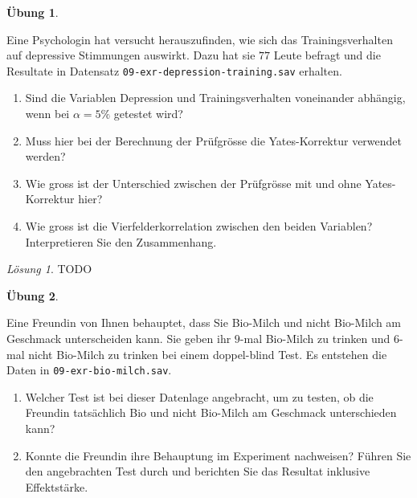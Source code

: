 \documentclass[
]{book}
\providecommand{\tightlist}{%
  \setlength{\itemsep}{0pt}\setlength{\parskip}{0pt}}
\theoremstyle{definition}
\theoremstyle{definition}
\theoremstyle{definition}
\newtheorem{exercise}{Übung}[chapter]
\theoremstyle{definition}
\theoremstyle{remark}
\newtheorem*{solution}{Lösung}
\begin{document}
\begin{exercise}
\protect\hypertarget{exr:depression-training}{}\label{exr:depression-training}\leavevmode

Eine Psychologin hat versucht herauszufinden, wie sich das Trainingsverhalten auf depressive Stimmungen auswirkt. Dazu hat sie \(77\) Leute befragt und die Resultate in Datensatz \texttt{09-exr-depression-training.sav} erhalten.

\begin{enumerate}
\def\labelenumi{\alph{enumi})}
\tightlist
\item
  Sind die Variablen Depression und Trainingsverhalten voneinander abhängig, wenn bei \(\alpha = 5\%\) getestet wird?
\item
  Muss hier bei der Berechnung der Prüfgrösse die Yates-Korrektur verwendet werden?
\item
  Wie gross ist der Unterschied zwischen der Prüfgrösse mit und ohne Yates-Korrektur hier?
\item
  Wie gross ist die Vierfelderkorrelation zwischen den beiden Variablen? Interpretieren Sie den Zusammenhang.
\end{enumerate}

\end{exercise}

\begin{solution}
TODO
\end{solution}

\begin{exercise}
\protect\hypertarget{exr:bio-milch}{}\label{exr:bio-milch}\leavevmode

Eine Freundin von Ihnen behauptet, dass Sie Bio-Milch und nicht Bio-Milch am Geschmack unterscheiden kann. Sie geben ihr \(9\)-mal Bio-Milch zu trinken und \(6\)-mal nicht Bio-Milch zu trinken bei einem doppel-blind Test. Es entstehen die Daten in \texttt{09-exr-bio-milch.sav}.

\begin{enumerate}
\def\labelenumi{\alph{enumi})}
\tightlist
\item
  Welcher Test ist bei dieser Datenlage angebracht, um zu testen, ob die Freundin tatsächlich Bio und nicht Bio-Milch am Geschmack unterschieden kann?
\item
  Konnte die Freundin ihre Behauptung im Experiment nachweisen? Führen Sie den angebrachten Test durch und berichten Sie das Resultat inklusive Effektstärke.
\end{enumerate}

\end{exercise}
\end{document}
